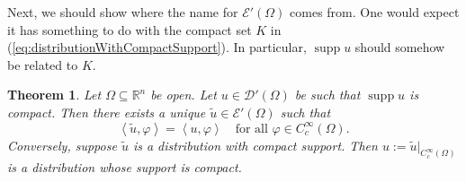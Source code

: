 \documentclass{book}
\newcommand{\scrD}{\mathscr{D}}
\newcommand{\scrE}{\mathscr{E}}
\newcommand{\bbR}{\mathbb{R}}
\renewcommand{\phi}{\varphi}
\newcommand{\angles}[1]{\left\langle {#1} \right\rangle}
\DeclareMathOperator{\supp}{supp}
\newtheorem{theorem}{Theorem}[chapter]
\theoremstyle{definition}
\theoremstyle{remark}
\numberwithin{equation}{chapter}
\begin{document}
Next, we should show where the name for $\scrE'(\Omega)$ comes from. One would expect it has something to do with the compact set $K$ in (\ref{eq:distributionWithCompactSupport}). In particular, $\supp{u}$ should somehow be related to $K$.
\begin{theorem}
    Let $\Omega \subseteq \bbR^n$ be open. Let $u \in \scrD'(\Omega)$ be such that $\supp{u}$ is compact. Then there exists a unique $\widetilde{u} \in \scrE'(\Omega)$ such that 
    \begin{equation} \label{eq:extensionOfCompactlySupportedDistribution}
        \angles{ \widetilde{u},\phi } = \angles{ u,\phi } \quad \text{for all } \phi \in C_c^\infty(\Omega).
    \end{equation}
    Conversely, suppose $\widetilde{u}$ is a distribution with compact support. Then $u := \widetilde{u} \vert_{C_c^\infty(\Omega)}$ is a distribution whose support is compact.
\end{theorem}
\end{document}
